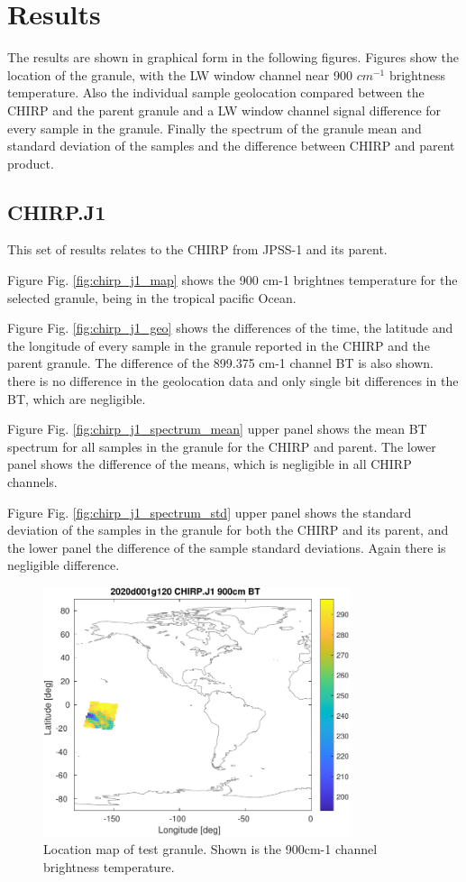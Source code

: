 \documentclass[11pt]{article}
\begin{document}
\section{Results}
\label{sec:org8adc8c9}

The results are shown in graphical form in the following figures. 
Figures show the location of the granule, with the LW window channel near 900 \(cm^{-1}\) 
brightness temperature.
Also the individual sample geolocation compared between the CHIRP and the parent granule
and a LW window channel signal difference for every sample in the granule.
Finally the spectrum of the granule mean and standard deviation of the samples and
the difference between CHIRP and parent product. 

\subsection{CHIRP.J1}
\label{sec:org46d2734}

This set of results relates to the CHIRP from JPSS-1 and its parent.

Figure Fig. \ref{fig:chirp_j1_map} shows the 900 cm-1 brightnes temperature for the selected granule, being in the tropical pacific Ocean.

Figure Fig. \ref{fig:chirp_j1_geo} shows the differences of the time, the latitude and the longitude of every sample in the granule  reported in the CHIRP and the parent granule. The difference of the 899.375 cm-1 channel BT is also shown. there is no difference in the geolocation data and only single bit differences in the BT, which are negligible.

Figure Fig. \ref{fig:chirp_j1_spectrum_mean} upper panel shows the mean BT spectrum for all samples in the granule for the CHIRP and parent. The lower panel shows the difference of the means, which is negligible in all CHIRP channels.

Figure Fig. \ref{fig:chirp_j1_spectrum_std} upper panel shows the standard deviation of the samples in the granule for both the CHIRP and its parent, and the lower panel the difference of the sample standard deviations. Again there is negligible difference.

\begin{figure}[htbp]
\centering
\includegraphics[angle=0,width=9cm]{./figs/2020d001g120_chirp_j1_900cn_bt_map.pdf}
\caption{\label{fig:orgca42ef6}
Location map of test granule. Shown is the 900cm-1 channel brightness temperature.}
\end{figure}
\end{document}
